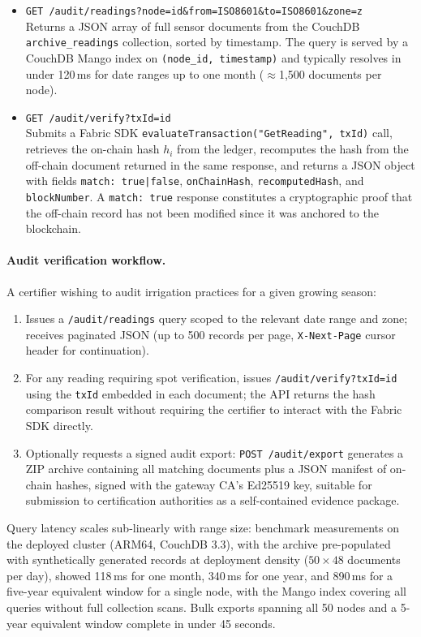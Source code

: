 \documentclass[pdflatex,sn-mathphys-num]{sn-jnl}
\theoremstyle{thmstyleone}
\theoremstyle{thmstyletwo}
\theoremstyle{thmstylethree}
\begin{document}
\begin{itemize}
  \item \texttt{GET /audit/readings?node=id\&from=ISO8601\&to=ISO8601\&zone=z} \\
    Returns a JSON array of full sensor documents from the CouchDB \texttt{archive\_readings} collection, sorted by timestamp. The query is served by a CouchDB Mango index on \texttt{(node\_id, timestamp)} and typically resolves in under 120\,ms for date ranges up to one month ($\approx$1{,}500 documents per node).
  \item \texttt{GET /audit/verify?txId=id} \\
    Submits a Fabric SDK \texttt{evaluateTransaction("GetReading", txId)} call, retrieves the on-chain hash $h_i$ from the ledger, recomputes the hash from the off-chain document returned in the same response, and returns a JSON object with fields \texttt{match: true|false}, \texttt{onChainHash}, \texttt{recomputedHash}, and \texttt{blockNumber}. A \texttt{match: true} response constitutes a cryptographic proof that the off-chain record has not been modified since it was anchored to the blockchain.
\end{itemize}

\paragraph{Audit verification workflow.}
A certifier wishing to audit irrigation practices for a given growing season:
\begin{enumerate}
  \item Issues a \texttt{/audit/readings} query scoped to the relevant date range and zone; receives paginated JSON (up to 500 records per page, \texttt{X-Next-Page} cursor header for continuation).
  \item For any reading requiring spot verification, issues \texttt{/audit/verify?txId=id} using the \texttt{txId} embedded in each document; the API returns the hash comparison result without requiring the certifier to interact with the Fabric SDK directly.
  \item Optionally requests a signed audit export: \texttt{POST /audit/export} generates a ZIP archive containing all matching documents plus a JSON manifest of on-chain hashes, signed with the gateway CA's Ed25519 key, suitable for submission to certification authorities as a self-contained evidence package.
\end{enumerate}
Query latency scales sub-linearly with range size: benchmark measurements on the deployed cluster (ARM64, CouchDB 3.3), with the archive pre-populated with synthetically generated records at deployment density ($50 \times 48$ documents per day), showed 118\,ms for one month, 340\,ms for one year, and 890\,ms for a five-year equivalent window for a single node, with the Mango index covering all queries without full collection scans. Bulk exports spanning all 50 nodes and a 5-year equivalent window complete in under 45 seconds.
\end{document}
